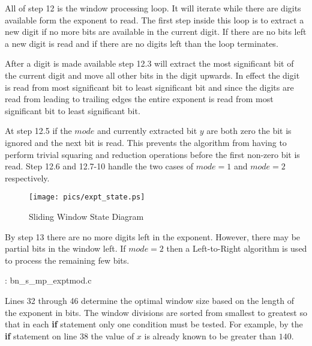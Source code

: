 \documentclass[b5paper]{book}
\begin{document}
All of step 12 is the window processing loop.  It will iterate while there are digits available form the exponent to read.  The first step
inside this loop is to extract a new digit if no more bits are available in the current digit.  If there are no bits left a new digit is
read and if there are no digits left than the loop terminates.  

After a digit is made available step 12.3 will extract the most significant bit of the current digit and move all other bits in the digit
upwards.  In effect the digit is read from most significant bit to least significant bit and since the digits are read from leading to 
trailing edges the entire exponent is read from most significant bit to least significant bit.

At step 12.5 if the $mode$ and currently extracted bit $y$ are both zero the bit is ignored and the next bit is read.  This prevents the 
algorithm from having to perform trivial squaring and reduction operations before the first non-zero bit is read.  Step 12.6 and 12.7-10 handle
the two cases of $mode = 1$ and $mode = 2$ respectively.  

\begin{center}
\begin{figure}[here]
\texttt{[image: pics/expt\_state.ps]}
\caption{Sliding Window State Diagram}
\label{pic:expt_state}
\end{figure}
\end{center}

By step 13 there are no more digits left in the exponent.  However, there may be partial bits in the window left.  If $mode = 2$ then 
a Left-to-Right algorithm is used to process the remaining few bits.  

\vspace{+3mm}\begin{small}
\hspace{-5.1mm}{\bf File}: bn\_s\_mp\_exptmod.c
\vspace{-3mm}
\begin{alltt}
\end{alltt}
\end{small}

Lines 32 through 46 determine the optimal window size based on the length of the exponent in bits.  The window divisions are sorted
from smallest to greatest so that in each \textbf{if} statement only one condition must be tested.  For example, by the \textbf{if} statement 
on line 38 the value of $x$ is already known to be greater than $140$.  
\end{document}
